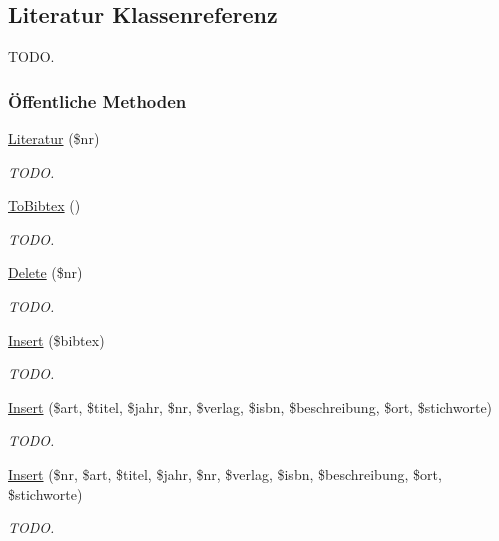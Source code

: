 \hypertarget{classLiteratur}{
\subsection{Literatur Klassenreferenz}
\label{classLiteratur}
}
TODO.  


\subsubsection*{\"{O}ffentliche Methoden}
\begin{CompactItemize}
\item 
\hyperlink{classLiteratur_55626b912da4c041eaf981781ed6c640}{Literatur} (\$nr)
\begin{CompactList}\small\item\em TODO. \item\end{CompactList}\item 
\hyperlink{classLiteratur_11f6d1a4409c41638ff6693f65699ff3}{To\-Bibtex} ()
\begin{CompactList}\small\item\em TODO. \item\end{CompactList}\item 
\hyperlink{classLiteratur_f5b265d349df2a9d17079b81d808fa89}{Delete} (\$nr)
\begin{CompactList}\small\item\em TODO. \item\end{CompactList}\item 
\hyperlink{classLiteratur_fbaac222c1150d9a6250119aedd83ea5}{Insert} (\$bibtex)
\begin{CompactList}\small\item\em TODO. \item\end{CompactList}\item 
\hyperlink{classLiteratur_0379134616374fa2b1bc7b9a761f3970}{Insert} (\$art, \$titel, \$jahr, \$nr, \$verlag, \$isbn, \$beschreibung, \$ort, \$stichworte)
\begin{CompactList}\small\item\em TODO. \item\end{CompactList}\item 
\hyperlink{classLiteratur_6d2064fd0c0be78e10f992396dfd43a4}{Insert} (\$nr, \$art, \$titel, \$jahr, \$nr, \$verlag, \$isbn, \$beschreibung, \$ort, \$stichworte)
\begin{CompactList}\small\item\em TODO. \item\end{CompactList}\end{CompactItemize}
